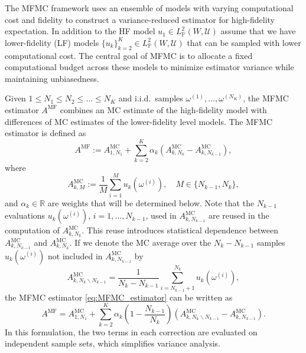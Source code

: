 The MFMC framework uses an ensemble of models with varying computational cost and fidelity 
to construct a variance-reduced estimator for high-fidelity expectation. 
In addition to the HF model $u_1 \in   L_{\mathbb{P}}^2(W, {\mathcal U})$ assume that we have lower-fidelity (LF) models
$\{u_k\}_{k=2}^K \in   L_{\mathbb{P}}^2(W, {\mathcal U})$ that can be sampled with lower computational cost.
The central goal of MFMC is to allocate a fixed computational budget across these models to minimize estimator variance while maintaining unbiasedness.

Given $1 \le N_1 \le N_2 \le \ldots \le N_K$ and i.i.d.\ samples $\omega^{(1)}, \ldots, \omega^{(N_K)}$,
the MFMC estimator $A^{\text{MF}}$ combines an MC estimate of the high-fidelity model with differences 
of MC estimates of the lower-fidelity level models.
The MFMC estimator is defined as
\begin{equation}\label{eq:MFMC_estimator}
    A^{\text{MF}}
     := A^{\text{MC}}_{1,N_1} + \sum_{k=2}^K \alpha_k\left(A^{\text{MC}}_{k,N_k} - A^{\text{MC}}_{k,N_{k-1}} \right),
\end{equation}
where
\begin{equation}\label{eq:MFMC_estimator_MCk}
     A^{\text{MC}}_{k,M} :=  \frac{1}{M} \sum_{i=1}^{M}   u_k(\omega^{(i)}), \quad M \in \{ N_{k-1}, N_k \},
\end{equation}
and $\alpha_k\in \mathbb{R}$ are weights that will be determined below.
Note that the $N_{k-1}$ evaluations $u_k(\omega^{(i)})$, $i = 1, \ldots,  N_{k-1}$,
used in  $A^{\text{MC}}_{k,N_{k-1}}$ are reused in  the computation of $A^{\text{MC}}_{k,N_k}$.
This reuse introduces statistical dependence between 
$A^{\text{MC}}_{k,N_{k-1}}$ and $A^{\text{MC}}_{k,N_k}$. 
If we denote the MC average over the $N_k - N_{k-1}$ samples $u_k(\omega^{(i)})$ 
not included in $A^{\text{MC}}_{k,N_{k-1}}$ by
\[
     A^{\text{MC}}_{k,N_k \backslash N_{k-1}}
      =  \frac{1}{N_k-N_{k-1}}  \sum_{i=N_{k-1}+1}^{N_k}   u_k(\omega^{(i)}), 
\]
the MFMC estimator \eqref{eq:MFMC_estimator} can be written as
\begin{equation}\label{eq:MFMC_estimator_independent}
    A^{\text{MF}} 
    = A^{\text{MC}}_{1,N_1} 
      +  \sum_{k=2}^K \alpha_k\left(1-\frac{N_{k-1}}{N_k}\right)
                               \left(A_{k,N_k\backslash N_{k-1}}^{\text{MC}}-A_{k,N_{k-1}}^{\text{MC}}\right).
\end{equation}
In this formulation, the two terms in each correction are evaluated on independent sample sets, 
which simplifies variance analysis. 
